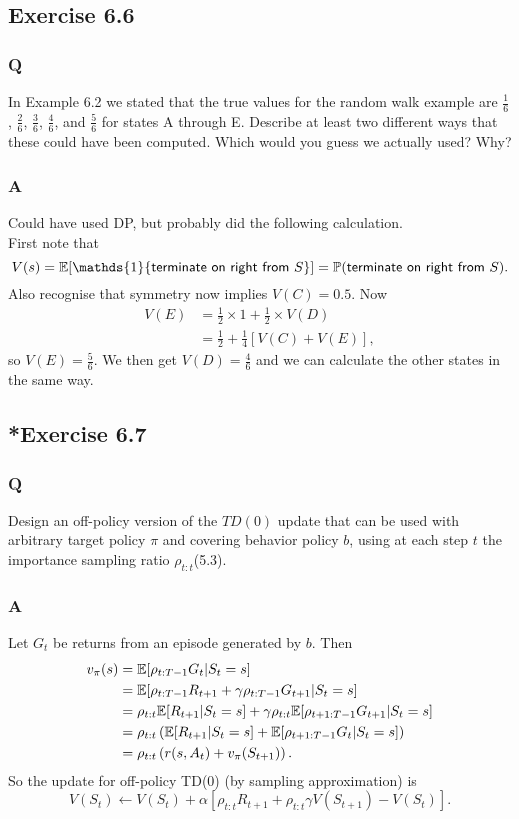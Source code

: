 \subsection{Exercise 6.6}
\subsubsection{Q}
In Example 6.2 we stated that the true values for the random walk example are $\frac16$, $\frac26$, $\frac36$, $\frac46$, and $\frac56$ for states A through E. Describe at least two different ways that these could have been computed. Which would you guess we actually used? Why?
\subsubsection{A}
Could have used DP, but probably did the following calculation.\\

First note that
\[
    V(s) = \E{}[\mathds{1}\{\textsf{terminate on right from } S\}] = \P{}(\textsf{terminate on right from } S).
\]
Also recognise that symmetry now implies $V(C) = 0.5$. Now
\begin{align*}
    V(E) &= \frac12 \times 1 + \frac12 \times V(D) \\
         &= \frac12 + \frac14[V(C) + V(E)],
\end{align*}
so $V(E) = \frac56$. We then get $V(D) = \frac46$ and we can calculate the other states in the same way.

\subsection{*Exercise 6.7}
\subsubsection{Q}
Design an off-policy version of the $TD(0)$ update that can be used with arbitrary target policy $\pi$ and covering behavior policy $b$, using at each step $t$ the importance sampling ratio $\rho_{t:t}$(5.3).
\subsubsection{A}
Let $G_t$ be returns from an episode generated by $b$. Then
\begin{align*}
    v_\pi(s) &= \mathbb{E}{}[\rho_{t:T-1}G_t | S_t=s]\\
             &= \mathbb{E}{}[\rho_{t:T-1} R_{t+1} + \gamma \rho_{t:T-1}G_{t+1} | S_t=s] \\
             &= \rho_{t:t} \mathbb{E}{}[R_{t+1}|S_t=s] + \gamma \rho_{t:t}\mathbb{E}{}[\rho_{t+1:T-1}G_{t+1} |S_t=s] \\
             &= \rho_{t:t} \left( \mathbb{E}{}[R_{t+1} | S_t=s] + \mathbb{E}{}[\rho_{t+1:T-1}G_t| S_t = s] \right)\\
             &= \rho_{t:t} \left( r(s, A_t) + v_\pi(S_{t+1})\right).
\end{align*}
So the update for off-policy TD(0) (by sampling approximation) is 
\begin{equation}
    V(S_t) \leftarrow V(S_t) + \alpha \left[ \rho_{t:t} R_{t+1} + \rho_{t:t} \gamma V(S_{t+1}) - V(S_t) \right].
\end{equation}

